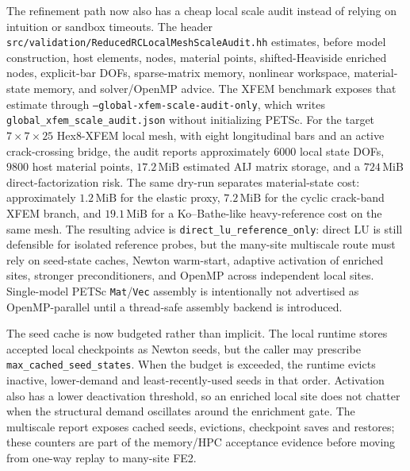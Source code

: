 The refinement path now also has a cheap local scale audit instead of relying
on intuition or sandbox timeouts.  The header
\texttt{src/validation/ReducedRCLocalMeshScaleAudit.hh} estimates, before model
construction, host elements, nodes, material points, shifted-Heaviside enriched
nodes, explicit-bar DOFs, sparse-matrix memory, nonlinear workspace,
material-state memory, and solver/OpenMP advice.  The XFEM benchmark exposes
that estimate through \texttt{--global-xfem-scale-audit-only}, which writes
\texttt{global\_xfem\_scale\_audit.json} without initializing PETSc.  For the
target \(7\times7\times25\) Hex8-XFEM local mesh, with eight longitudinal bars
and an active crack-crossing bridge, the audit reports approximately \(6000\)
local state DOFs, \(9800\) host material points, \(17.2\,\mathrm{MiB}\)
estimated AIJ matrix storage, and a \(724\,\mathrm{MiB}\) direct-factorization
risk.  The same dry-run separates material-state cost: approximately
\(1.2\,\mathrm{MiB}\) for the elastic proxy, \(7.2\,\mathrm{MiB}\) for the
cyclic crack-band XFEM branch, and \(19.1\,\mathrm{MiB}\) for a Ko--Bathe-like
heavy-reference cost on the same mesh.  The resulting advice is
\texttt{direct\_lu\_reference\_only}: direct LU
is still defensible for isolated reference probes, but the many-site
multiscale route must rely on seed-state caches, Newton warm-start, adaptive
activation of enriched sites, stronger preconditioners, and OpenMP across
independent local sites.  Single-model PETSc \texttt{Mat}/\texttt{Vec}
assembly is intentionally not advertised as OpenMP-parallel until a
thread-safe assembly backend is introduced.

The seed cache is now budgeted rather than implicit.  The local runtime stores
accepted local checkpoints as Newton seeds, but the caller may prescribe
\texttt{max\_cached\_seed\_states}.  When the budget is exceeded, the runtime
evicts inactive, lower-demand and least-recently-used seeds in that order.
Activation also has a lower deactivation threshold, so an enriched local site
does not chatter when the structural demand oscillates around the enrichment
gate.  The multiscale report exposes cached seeds, evictions, checkpoint saves
and restores; these counters are part of the memory/HPC acceptance evidence
before moving from one-way replay to many-site FE2.

